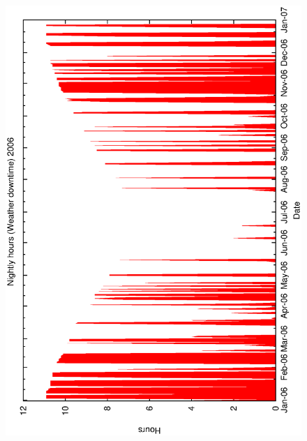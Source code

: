 {{\begin{figure}[htbp]
\begin{center}
{    \includegraphics[scale=0.4, angle=-90]{figures/ecs/met_nightly_stats_weather2006.eps}
  } 
\end{center}
\end{figure}}}
